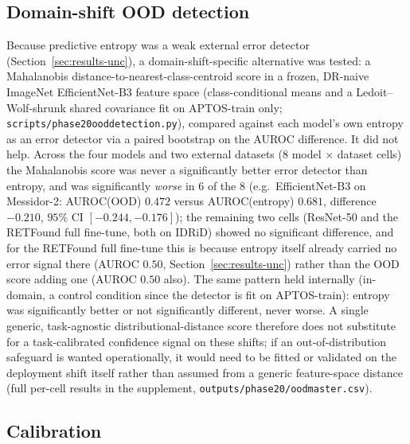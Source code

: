 \documentclass[journal]{IEEEtran}
\renewcommand{\_}{\origunderscore\allowbreak}
\begin{document}
\subsection{Domain-shift OOD detection}
\label{sec:results-ood}

Because predictive entropy was a weak external error detector
(Section~\ref{sec:results-unc}), a domain-shift-specific alternative was tested:
a Mahalanobis distance-to-nearest-class-centroid score in a frozen, DR-naive
ImageNet EfficientNet-B3 feature space (class-conditional means and a
Ledoit--Wolf-shrunk shared covariance fit on APTOS-train only;
\texttt{scripts/\allowbreak{}phase20\_ood\_detection.py}), compared against each model's
own entropy as an error detector via a paired bootstrap on the AUROC
difference. It did not help. Across the four models and two external datasets ($8$
model $\times$ dataset cells) the Mahalanobis score was never a significantly
better error detector than entropy, and was significantly \emph{worse} in
$6$ of the $8$ (e.g.\ EfficientNet-B3 on Messidor-2: AUROC(OOD) $0.472$ versus
AUROC(entropy) $0.681$, difference $-0.210$, $95\%$ CI $[-0.244,-0.176]$); the
remaining two cells (ResNet-50 and the RETFound full fine-tune, both on IDRiD)
showed no significant difference, and for the RETFound full fine-tune this is
because entropy itself already carried no error signal there (AUROC $0.50$,
Section~\ref{sec:results-unc}) rather than the OOD score adding one (AUROC
$0.50$ also). The same pattern held internally (in-domain, a control condition
since the detector is fit on APTOS-train): entropy was significantly better
or not significantly different, never worse. A single
generic, task-agnostic distributional-distance score therefore does not
substitute for a task-calibrated confidence signal on these shifts; if an
out-of-distribution safeguard is wanted operationally, it would need to be
fitted or validated on the deployment shift itself rather than assumed from a
generic feature-space distance (full per-cell results in the supplement,
\texttt{outputs/\allowbreak{}phase20/\allowbreak{}ood\_master.csv}).

\subsection{Calibration}
\label{sec:results-calib}
\end{document}
